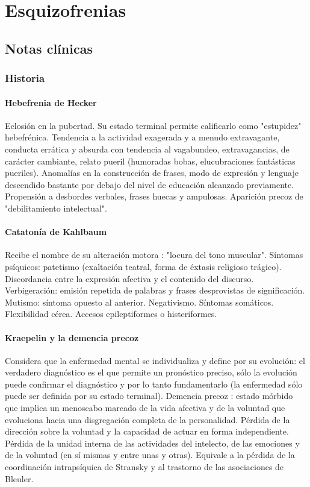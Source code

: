 \chapter{Esquizofrenias}
\section*{Notas clínicas}
\subsection*{Historia}
\subsubsection*{Hebefrenia de Hecker}
Eclosión en la pubertad. Su estado terminal permite calificarlo como "estupidez" hebefrénica. Tendencia a la actividad exagerada y a menudo extravagante, conducta errática y absurda con tendencia al vagabundeo, extravagancias, de carácter cambiante, relato pueril (humoradas bobas, elucubraciones fantásticas pueriles). Anomalías en la construcción de frases, modo de expresión y lenguaje descendido bastante por debajo del nivel de educación alcanzado previamente. Propensión a desbordes verbales, frases huecas y ampulosas. Aparición precoz de "debilitamiento intelectual".
\subsubsection*{Catatonía de Kahlbaum}
Recibe el nombre de su alteración motora : "locura del tono muscular". Síntomas psíquicos: patetismo (exaltación teatral, forma de éxtasis religioso trágico). Discordancia entre la expresión afectiva y el contenido del discurso. Verbigeración: emisión repetida de palabras y frases desprovistas de significación. Mutismo: síntoma opuesto al anterior. Negativismo. Síntomas somáticos. Flexibilidad cérea. Accesos epileptiformes o histeriformes.
\subsubsection*{Kraepelin y la demencia precoz}
Considera que la enfermedad mental se individualiza y define por su evolución: el verdadero diagnóstico es el que permite un pronóstico preciso, sólo la evolución puede confirmar el diagnóstico y por lo tanto fundamentarlo (la enfermedad sólo puede ser definida por su estado terminal).
Demencia precoz : estado mórbido que implica un menoscabo marcado de la vida afectiva y de la voluntad que evoluciona hacia una disgregación completa de la personalidad. Pérdida de la dirección sobre la voluntad y la capacidad de actuar en forma independiente. Pérdida de la unidad interna de las actividades del intelecto, de las emociones y de la voluntad (en sí mismas y entre unas y otras). Equivale a la pérdida de la coordinación intrapsíquica de Stransky y al trastorno de las asociaciones de Bleuler.
